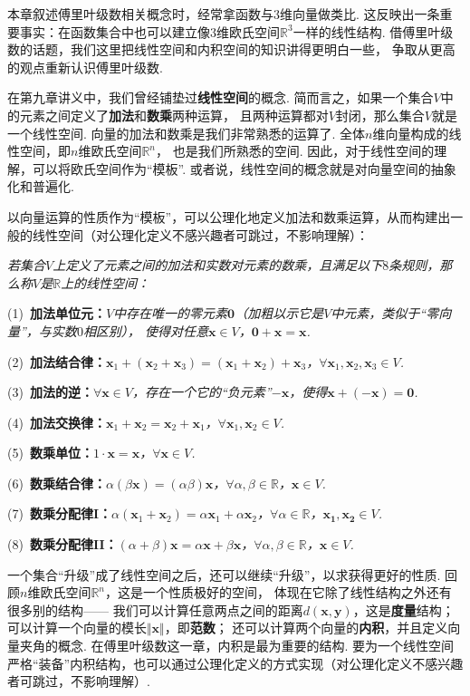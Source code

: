 本章叙述傅里叶级数相关概念时，经常拿函数与$3$维向量做类比.
这反映出一条重要事实：在函数集合中也可以建立像$3$维欧氏空间$\mathbb{R}^3$一样的线性结构.
借傅里叶级数的话题，我们这里把线性空间和内积空间的知识讲得更明白一些，
争取从更高的观点重新认识傅里叶级数.

在第九章讲义中，我们曾经铺垫过\textbf{线性空间}的概念.
简而言之，如果一个集合$V$中的元素之间定义了\textbf{加法}和\textbf{数乘}两种运算，
且两种运算都对$V$封闭，那么集合$V$就是一个线性空间.
向量的加法和数乘是我们非常熟悉的运算了.
全体$n$维向量构成的线性空间，即$n$维欧氏空间$\mathbb{R}^n$，
也是我们所熟悉的空间.
因此，对于线性空间的理解，可以将欧氏空间作为“模板”.
或者说，线性空间的概念就是对向量空间的抽象化和普遍化.

以向量运算的性质作为“模板”，可以公理化地定义加法和数乘运算，从而构建出一般的线性空间（对公理化定义不感兴趣者可跳过，不影响理解）：\medskip

\textit{若集合$V$上定义了元素之间的加法和实数对元素的数乘，且满足以下$8$条规则，那么称$V$是$\mathbb{R}$上的线性空间：}

(1)~\textbf{加法单位元：}\textit{$V$中存在唯一的零元素$\bm{0}$（加粗以示它是$V$中元素，类似于“零向量”，与实数$0$相区别），
使得对任意$\bm{x} \in V$，$\bm{0} + \bm{x} = \bm{x}$. }

(2)~\textbf{加法结合律：}\textit{$\bm{x}_1 +( \bm{x}_2 + \bm{x}_3) = (\bm{x}_1 + \bm{x}_2) + \bm{x}_3$，$\forall \bm{x}_1,\bm{x}_2, \bm{x}_3 \in V$.}

(3)~\textbf{加法的逆：}\textit{$\forall \bm{x} \in V$，存在一个它的“负元素”$-\bm{x}$，使得$\bm{x}+(-\bm{x}) = \bm{0}$.}

(4)~\textbf{加法交换律：}\textit{$\bm{x}_1 + \bm{x}_2 = \bm{x}_2 + \bm{x}_1$，$\forall \bm{x}_1,\bm{x}_2 \in V$.}

(5)~\textbf{数乘单位：}\textit{$1 \cdot \bm{x} = \bm{x}$，$\forall \bm{x} \in V$.}

(6)~\textbf{数乘结合律：}\textit{$\alpha(\beta \bm{x}) = (\alpha \beta)\bm{x}$，$\forall \alpha,\beta \in \mathbb{R}$，$\bm{x} \in V$.}

(7)~\textbf{数乘分配律I：}\textit{$\alpha (\bm{x}_1 + \bm{x}_2) = \alpha \bm{x}_1 + \alpha \bm{x}_2$，$\forall \alpha \in \mathbb{R}$，$\bm{x_1},\bm{x_2} \in V$.}

(8)~\textbf{数乘分配律II：}\textit{$(\alpha + \beta)\bm{x} = \alpha \bm{x} + \beta \bm{x}$，$\forall \alpha,\beta \in \mathbb{R}$，$\bm{x} \in V$.}\medskip

一个集合“升级”成了线性空间之后，还可以继续“升级”，以求获得更好的性质.
回顾$n$维欧氏空间$\mathbb{R}^n$，这是一个性质极好的空间，
体现在它除了线性结构之外还有很多别的结构——
我们可以计算任意两点之间的距离$d(\bm{x},\bm{y})$，这是\textbf{度量}结构；
可以计算一个向量的模长$\Vert \bm{x} \Vert$，即\textbf{范数}；
还可以计算两个向量的\textbf{内积}，并且定义向量夹角的概念.
在傅里叶级数这一章，内积是最为重要的结构.
要为一个线性空间严格“装备”内积结构，也可以通过公理化定义的方式实现（对公理化定义不感兴趣者可跳过，不影响理解）.

